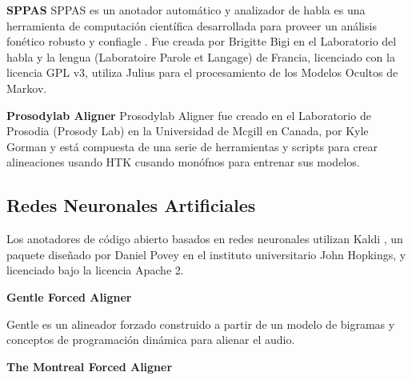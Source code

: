 \textbf{SPPAS}
SPPAS es un anotador automático y analizador de habla es una herramienta de computación científica desarrollada para proveer un análisis fonético robusto y confiagle \cite{Bigi2016ASPPAS}. Fue creada por Brigitte Bigi  en el Laboratorio del habla y la lengua (Laboratoire Parole et Langage) de Francia, licenciado con la licencia GPL v3, utiliza Julius para el procesamiento de los Modelos Ocultos de Markov.

\textbf{Prosodylab Aligner}
Prosodylab Aligner \cite{Gorman2011Prosodylab-aligner:Speech} fue creado en el Laboratorio de Prosodia (Prosody Lab) en la Universidad de Mcgill en Canada, por Kyle Gorman y está compuesta de una serie de herramientas y scripts para crear alineaciones usando HTK cusando monófnos para entrenar sus modelos.

\subsection{Redes Neuronales Artificiales}

Los anotadores de código abierto basados en redes neuronales utilizan Kaldi \cite{Povey_ASRU2011}, un paquete diseñado por Daniel Povey en el instituto universitario John Hopkings, y licenciado bajo la licencia Apache 2.

\textbf{Gentle Forced Aligner}

Gentle \cite{gentle} es un alineador forzado construido a partir de un modelo de bigramas y conceptos de programación dinámica para alienar el audio.

\textbf{The Montreal Forced Aligner}

